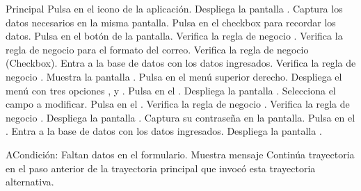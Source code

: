 	\begin{UCtrayectoria}{Principal}
		\UCpaso[\UCactor] Pulsa en el icono de la aplicación.
		\UCpaso[\UCsist] Despliega la pantalla .
		\UCpaso[\UCactor] Captura los datos necesarios en la misma pantalla.
		\UCpaso[\UCactor] Pulsa en el checkbox para recordar los datos.
		\UCpaso[\UCactor] Pulsa en el botón  de la pantalla.
		\UCpaso[\UCsist] Verifica la regla de negocio . 
		\UCpaso[\UCsist] Verifica la regla de negocio   para el formato del correo. 
		\UCpaso[\UCsist] Verifica la regla de negocio (Checkbox). 
		\UCpaso[\UCsist] Entra a la base de datos con los datos ingresados. 
		\UCpaso[\UCsist] Verifica la regla de negocio . 
		\UCpaso[\UCsist] Muestra la pantalla .
		\UCpaso[\UCactor] Pulsa en el menú superior derecho.
		\UCpaso[\UCsist] Despliega el menú con tres opciones , y .
		\UCpaso[\UCactor] Pulsa en el  .
		\UCpaso[\UCsist] Despliega la pantalla .
		\UCpaso[\UCactor] Selecciona el campo a modificar.
		\UCpaso[\UCactor] Pulsa en el  .
		\UCpaso[\UCsist] Verifica la regla de negocio . 
		\UCpaso[\UCsist] Verifica la regla de negocio . 
		\UCpaso[\UCsist] Despliega la pantalla .
		\UCpaso[\UCactor] Captura su contraseña en la pantalla.
		\UCpaso[\UCactor] Pulsa en el  .
		\UCpaso[\UCsist] Entra a la base de datos con los datos ingresados.   
		\UCpaso[\UCsist] Despliega la pantalla .
	\end{UCtrayectoria}
	\begin{UCtrayectoriaA}{A}{Condición: Faltan datos en el formulario.}
		\UCpaso[\UCsist] Muestra mensaje 
		\UCpaso[\UCsist] Continúa trayectoria en el paso anterior de la trayectoria  principal que invocó esta trayectoria alternativa. 
	\end{UCtrayectoriaA}
